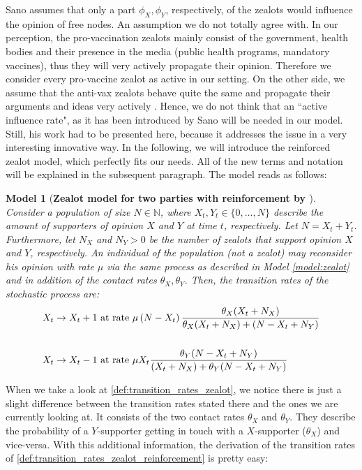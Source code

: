 \documentclass[12pt,a4paper,twoside]{article}
\newtheorem{model}{Model}[section]
\begin{document}
Sano assumes that only a part $\phi_X, \phi_Y$, respectively, of the zealots would influence the opinion of free nodes. An assumption we do not totally agree with. In our perception, the pro-vaccination zealots mainly consist of the government, health bodies and their presence in the media (public health programs, mandatory vaccines), thus they will very actively propagate their opinion. Therefore we consider every pro-vaccine zealot as active in our setting. On the other side, we assume that the anti-vax zealots behave quite the same and propagate their arguments and ideas very actively \cite{Davies2002, Meyer2004}. Hence, we do not think that an ``active influence rate", as it has been introduced by Sano will be needed in our model. Still, his work had to be presented here, because it addresses the issue in a very interesting innovative way. In the following, we will introduce the reinforced zealot model, which perfectly fits our needs. All of the new terms and notation will be explained in the subsequent paragraph. The model reads as follows:
\begin{model}[\textbf{Zealot model for two parties with reinforcement by \cite{JohannesMuller2020}}]\label{model:zealot_reinforcement}
	Consider a population of size $N \in \mathbb{N}$, where $X_t, Y_t \in \lbrace 0,\dots, N\rbrace$ describe the amount of supporters of opinion $X$ and $Y$ at time $t$, respectively. Let $N = X_t + Y_t$. Furthermore, let $N_X$ and $N_Y > 0$ be the number of zealots that support opinion $X$ and $Y$, respectively. An individual of the population (not a zealot) may reconsider his opinion with rate $\mu$ via the same process as described in Model \ref{model:zealot} and in addition of the contact rates $\theta_X, \theta_Y$. Then, the transition rates of the stochastic process are:
	\begin{align}\label{def:transition_rates_zealot_reinforcement}
	\begin{split}
	X_t \rightarrow X_t + 1 & \textnormal{ at rate } \mu\left(N-X_t\right)\frac{\theta_X (X_t + N_X)}{\theta_X (X_t + N_X) + (N - X_t + N_Y)} \\
	&\\
	X_t \rightarrow X_t - 1 & \textnormal{ at rate } \mu X_t\frac{\theta_Y(N-X_t+N_Y)}{(X_t + N_X) + \theta_Y(N-X_t+N_Y)}
	\end{split}
	\end{align}
\end{model}

When we take a look at \eqref{def:transition_rates_zealot}, we notice there is just a slight difference between the transition rates stated there and the ones we are currently looking at. It consists of the two contact rates $\theta_X$ and $\theta_Y$. They describe the probability of a $Y$-supporter getting in touch with a $X$-supporter ($\theta_X$) and vice-versa. With this additional information, the derivation of the transition rates of \eqref{def:transition_rates_zealot_reinforcement} is pretty easy:\newline
\end{document}
